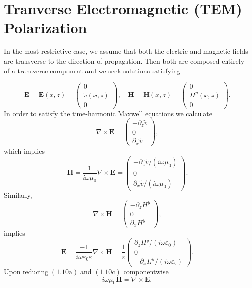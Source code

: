 \section{Tranverse Electromagnetic (TEM) Polarization}
\label{intro:tem_polarization}

In the most restrictive case, we assume that both the electric and magnetic fields are transverse to the direction of propagation. Then both are composed entirely of a transverse component and we seek solutions satisfying

\begin{equation}
\textbf{E}=\textbf{E}(x,z)=\begin{pmatrix}
0\\ \tilde{v}(x,z) \\ 0
\end{pmatrix},\quad 
\textbf{H}=\textbf{H}(x,z)=\begin{pmatrix}
0\\ H^y(x,z)\\ 0
\end{pmatrix}.
\end{equation}
In order to satisfy the time-harmonic Maxwell equations we calculate
$$\nabla \times \textbf{E}= \begin{pmatrix}
-\partial_z \tilde{v}\\ 0 \\ \partial_x \tilde{v}
\end{pmatrix},$$
which implies
$$\textbf{H} = \frac{1}{i\omega\mu_0}\nabla \times \textbf{E} =\begin{pmatrix}
-\partial_z \tilde{v}/(i\omega\mu_0)\\ 0 \\ \partial_x \tilde{v}/(i\omega\mu_0)
\end{pmatrix}.$$
Similarly,
$$\nabla \times \textbf{H}=\begin{pmatrix}
-\partial_z H^y\\ 0 \\ \partial_x H^y
\end{pmatrix},$$
implies
$$\textbf{E} = \frac{-1}{i\omega\varepsilon_0\varepsilon}\nabla \times \textbf{H} =\frac{1}{\varepsilon}\begin{pmatrix}
\partial_z H^y/(i\omega\varepsilon_0)\\ 0 \\ -\partial_x H^y/(i\omega\varepsilon_0)
\end{pmatrix}.$$
Upon reducing $(1.10\text{a})$ and $(1.10\text{c})$ componentwise
$$i\omega\mu_0 \textbf{H} = \nabla \times \textbf{E},$$
